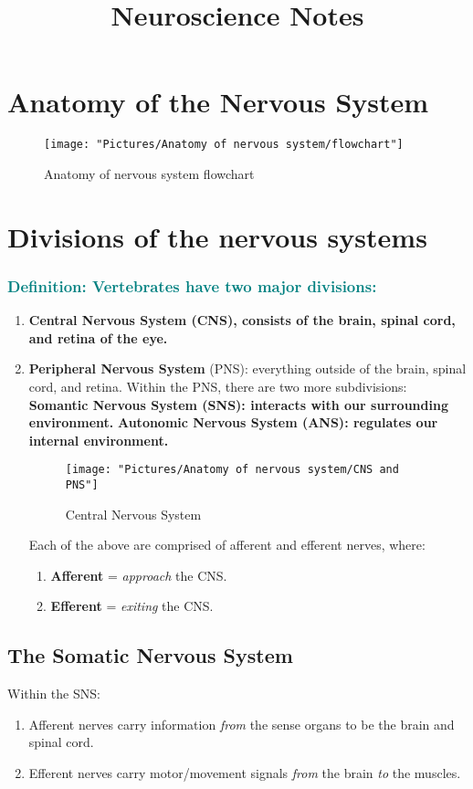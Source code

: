 \documentclass[12pt,a4paper]{article}
\title{\textbf{Neuroscience Notes}}
\author{}
\date{}
\newcommand{\definition}[1]{\subsubsection*{\textcolor{teal}{Definition: #1}}}
\begin{document}
	
	\maketitle
	\tableofcontents
	\newpage
	
	\section*{Anatomy of the Nervous System}
	
	
\begin{figure}
	\centering
	\texttt{[image: "Pictures/Anatomy of nervous system/flowchart"]}
	\caption{Anatomy of nervous system flowchart}
	\label{fig:flowchart}
\end{figure}

	
	\section{Divisions of the nervous systems}
	\definition{Vertebrates have two major divisions:}
	\begin{enumerate}
		\item \textbf{Central Nervous System (CNS), consists of the brain, spinal cord, and retina of the eye.}
		\item \textbf{Peripheral Nervous System} (PNS): everything outside of the brain, spinal cord, and retina.
		\subitem Within the PNS, there are two more subdivisions: 
		\subsubitem \textbf{Somantic Nervous System (SNS): interacts with our surrounding environment.}
		\subsubitem \textbf{Autonomic Nervous System (ANS): regulates our internal environment.}
		
		
\begin{figure}
	\centering
	\texttt{[image: "Pictures/Anatomy of nervous system/CNS and PNS"]}
	\caption{Central Nervous System }
	\label{fig:cns-and-pns}
\end{figure}
		  
		\subitem Each of the above are comprised of afferent and efferent nerves, where: 
		\begin{enumerate}
			\item \textbf{Afferent} = \textit{approach} the CNS.
			\item \textbf{Efferent} = \textit{exiting} the CNS. 
		\end{enumerate}
	\end{enumerate}
	
	\subsection{The Somatic Nervous System}
	Within the SNS: 
	\begin{enumerate}
		\item Afferent nerves carry information \textit{from} the sense organs to be the brain and spinal cord. 
		\item Efferent nerves carry motor/movement signals \textit{from} the brain \textit{to} the muscles. 
	\end{enumerate}
	
\end{document}
